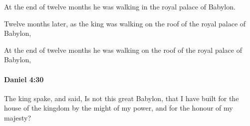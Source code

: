 			\begin{versebox}
					\item[BHS] 
					\item[LXX] 
					\item[ASV] At the end of twelve months he was walking in the royal palace of Babylon.
					\item[NIV] Twelve months later, as the king was walking on the roof of the royal palace of Babylon,
					\item[NRSV] At the end of twelve months he was walking on the roof of the royal palace of Babylon,
			\end{versebox}

		\paragraph{Daniel 4:30} %
			\label{DANIEL-4-30}

			The king spake, and said, Is not this great Babylon, that I have built for the house of the kingdom by the might of my power, and for the honour of my majesty?

